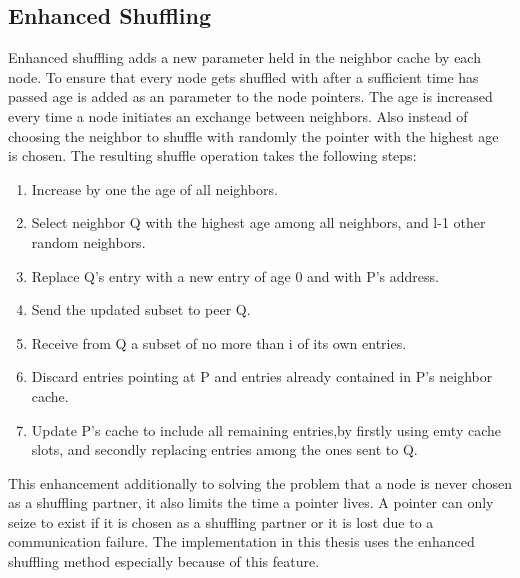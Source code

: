 \subsection{Enhanced Shuffling}
Enhanced shuffling adds a new parameter held in the neighbor cache by each node.
To ensure that every node gets shuffled with after a sufficient time has passed
age is added as an parameter to the node pointers. The age is increased every
time a node initiates an exchange between neighbors. Also instead of choosing
the neighbor to shuffle with randomly the pointer with the highest age is
chosen. The resulting shuffle operation takes the following steps:

\begin{enumerate}
\item Increase by one the age of all neighbors.
\item Select neighbor Q with the highest age among all neighbors, and l-1 other
random neighbors.
\item Replace Q's entry with a new entry of age 0 and with P's address.
\item Send the updated subset to peer Q.
\item Receive from Q a subset of no more than i of its own entries.
\item Discard entries pointing at P and entries already contained in P's
neighbor cache.
\item Update P's cache to include all remaining entries,by firstly using emty
cache slots, and secondly replacing entries among the ones sent to Q.
\end{enumerate}

This enhancement additionally to solving the problem that a node is never chosen
as a shuffling partner, it also limits the time a pointer lives. A pointer
can only seize to exist if it is chosen as a shuffling partner or it is lost
due to a communication failure. The implementation in this thesis uses the
enhanced shuffling method especially because of this feature.
